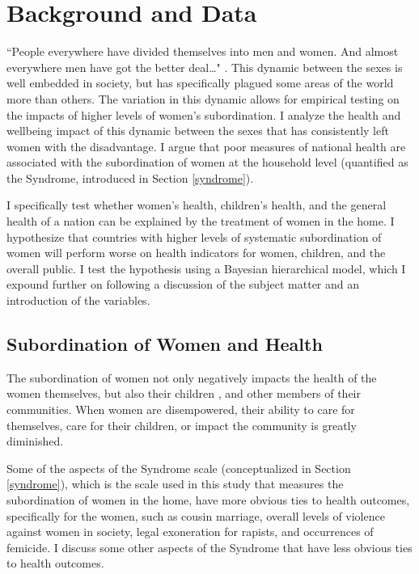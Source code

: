 
\chapter{Background and Data}

``People everywhere have divided themselves into men and women. And almost everywhere men have got the better deal…" \citep{Harari}. This dynamic between the sexes is well embedded in society, but has specifically plagued some areas of the world more than others. The variation in this dynamic allows for empirical testing on the impacts of higher levels of women's subordination. I analyze the health and wellbeing impact of this dynamic between the sexes that has consistently left women with the disadvantage. I argue that poor measures of national health are associated with the subordination of women at the household level (quantified as the Syndrome, introduced in Section \ref{syndrome}). 

I specifically test whether women's health, children's health, and the general health of a nation can be explained by the treatment of women in the home. I hypothesize that countries with higher levels of systematic subordination of women will perform worse on health indicators for women, children, and the overall public. I test the hypothesis using a Bayesian hierarchical model, which I expound further on following a discussion of the subject matter and an introduction of the variables. 

\section{Subordination of Women and Health}

The subordination of women not only negatively impacts the health of the women themselves, but also their children \citep{Nour2}, and other members of their communities. When women are disempowered, their ability to care for themselves, care for their children, or impact the community is greatly diminished.

Some of the aspects of the Syndrome scale (conceptualized in Section \ref{syndrome}), which is the scale used in this study that measures the subordination of women in the home, have more obvious ties to health outcomes, specifically for the women, such as cousin marriage, overall levels of violence against women in society, legal exoneration for rapists, and occurrences of femicide. I discuss some other aspects of the Syndrome that have less obvious ties to health outcomes.

